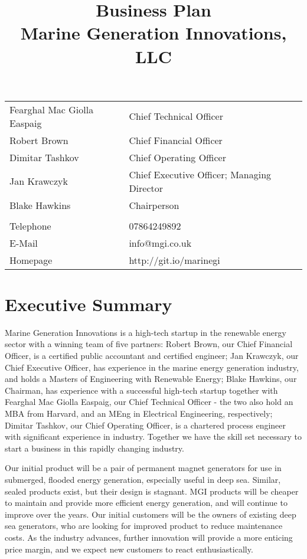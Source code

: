 \documentclass[a4paper,11pt]{article}
\title{Business Plan\\Marine Generation Innovations, LLC}
\begin{document}
\begin{titlepage}
    \centering
    \maketitle
    \thispagestyle{empty}   %
    \vfill
\begin{tabular}{l l}
    Fearghal Mac Giolla Easpaig & Chief Technical Officer \\
    Robert Brown & Chief Financial Officer \\
    Dimitar Tashkov & Chief Operating Officer \\
    Jan Krawczyk & Chief Executive Officer; Managing Director \\
    Blake Hawkins & Chairperson \\
    & \\
    Telephone & 07864249892 \\
    E-Mail & info@mgi.co.uk \\
    Homepage & http://git.io/marinegi
\end{tabular}

\end{titlepage}
\pagebreak

\tableofcontents
\pagebreak

\section{Executive Summary}

Marine Generation Innovations is a high-tech startup in the renewable energy sector with a winning team of five partners: Robert Brown, our Chief Financial Officer, is a certified public accountant and certified engineer; Jan Krawczyk, our Chief Executive Officer, has experience in the marine energy generation industry, and holds a Masters of Engineering with Renewable Energy; Blake Hawkins, our Chairman, has experience with a successful high-tech startup together with Fearghal Mac Giolla Easpaig, our Chief Technical Officer - the two also hold an MBA from Harvard, and an MEng in Electrical Engineering, respectively; Dimitar Tashkov, our Chief Operating Officer, is a chartered process engineer with significant experience in industry. Together we have the skill set necessary to start a business in this rapidly changing industry.

Our initial product will be a pair of permanent magnet generators for use in submerged, flooded energy generation, especially useful in deep sea. Similar, sealed products exist, but their design is stagnant. MGI products will be cheaper to maintain and provide more efficient energy generation, and will continue to improve over the years. Our initial customers will be the owners of existing deep sea generators, who are looking for improved product to reduce maintenance costs. As the industry advances, further innovation will provide a more enticing price margin, and we expect new customers to react enthusiastically.
\end{document}
